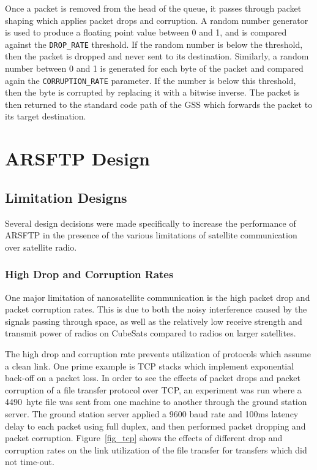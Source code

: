 \documentclass[journal]{./IEEEtran}
\begin{document}
Once a packet is removed from the head of the queue, it passes through packet shaping which applies packet drops and corruption.  A random number generator is used to produce a floating point value between 0 and 1, and is compared against the {\tt DROP\_RATE} threshold.  If the random number is below the threshold, then the packet is dropped and never sent to its destination.  Similarly, a random number between 0 and 1 is generated for each byte of the packet and compared again the {\tt CORRUPTION\_RATE} parameter.  If the number is below this threshold, then the byte is corrupted by replacing it with a bitwise inverse.  The packet is then returned to the standard code path of the GSS which forwards the packet to its target destination.

\section{ARSFTP Design}

\subsection{Limitation Designs}

Several design decisions were made specifically to increase the performance of ARSFTP in the presence of the various limitations of satellite communication over satellite radio.

\subsubsection{High Drop and Corruption Rates}

One major limitation of nanosatellite communication is the high packet drop and packet corruption rates.  This is due to both the noisy interference caused by the signals passing through space, as well as the relatively low receive strength and transmit power of radios on CubeSats compared to radios on larger satellites.

The high drop and corruption rate prevents utilization of protocols which assume a clean link.  One prime example is TCP stacks which implement exponential back-off on a packet loss.  In order to see the effects of packet drops and packet corruption of a file transfer protocol over TCP, an experiment was run where a 4490~hyte file was sent from one machine to another through the ground station server.  The ground station server applied a 9600 baud rate and 100ms latency delay to each packet using full duplex, and then performed packet dropping and packet corruption.  Figure~\ref{fig_tcp} shows the effects of different drop and corruption rates on the link utilization of the file transfer for transfers which did not time-out.
\end{document}
